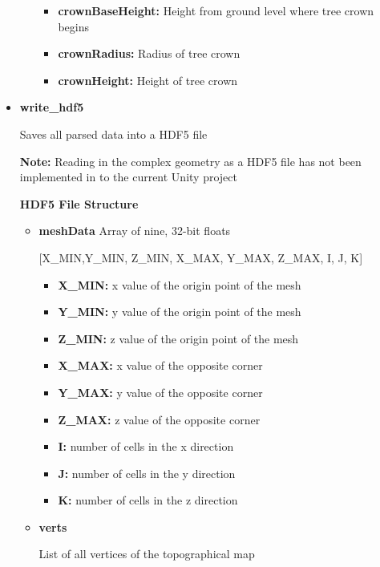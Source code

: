 \begin{itemize}
\begin{itemize}
\begin{itemize}
                    \item\textbf{crownBaseHeight:} Height from ground level where tree crown begins
                    \item\textbf{crownRadius:} Radius of tree crown
                    \item\textbf{crownHeight:} Height of tree crown 
                    \end{itemize}
                \end{itemize} 
    \item \textbf{write\_hdf5}
    \item[] Saves all parsed data into a HDF5 file 
    \item[] \textbf{Note:} Reading in the complex geometry as a HDF5 file has not been implemented in to the current Unity project
                \item[] \textbf{HDF5 File Structure}   
                \begin{itemize}
                \item\textbf{meshData} Array of nine, 32-bit floats
                \item[] [X\_MIN,Y\_MIN, Z\_MIN, X\_MAX, Y\_MAX, Z\_MAX, I, J, K]
                    \begin{itemize}
                    \item\textbf{X\_MIN:} x value of the origin point of the mesh 
                    \item\textbf{Y\_MIN:} y value of the origin point of the mesh 
                    \item\textbf{Z\_MIN:} z value of the origin point of the mesh 
                    \item\textbf{X\_MAX:} x value of the opposite corner
                    \item\textbf{Y\_MAX:} y value of the opposite corner
                    \item\textbf{Z\_MAX:} z value of the opposite corner
                    \item\textbf{I:} number of cells in the x direction
                    \item\textbf{J:} number of cells in the y direction
                    \item\textbf{K:} number of cells in the z direction
                    \end{itemize}
                \item\textbf{verts} 
                \item[] List of all vertices of the topographical map

\end{itemize}
\end{itemize}
